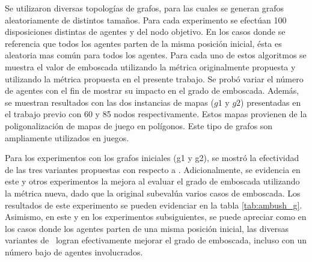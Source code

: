 Se utilizaron diversas topolog\'ias de grafos, para las cuales
se generan grafos aleatoriamente de distintos tamaños. Para cada
experimento se efect\'uan 100 disposiciones distintas de agentes
y del nodo objetivo. En los casos donde se referencia
que todos los agentes parten de la misma posici\'on inicial, \'esta es
aleatoria mas com\'un para todos los agentes.
Para cada uno de estos algoritmos se muestra el valor de emboscada
utilizando la m\'etrica originalmente propuesta y utilizando la
m\'etrica propuesta en el presente trabajo. Se prob\'o variar el
n\'umero de agentes con el fin de mostrar su impacto en el grado de emboscada.
Adem\'as, se muestran resultados con las dos instancias de mapas ($g1$ y $g2$)
presentadas en el trabajo previo \cite{FGC12} con 60 y 85 nodos
respectivamente. Estos mapas provienen de la poligonalizaci\'on de mapas
de juego en pol\'igonos. Este tipo de grafos son ampliamente utilizados
en juegos\cite{MF09}.



Para los experimentos con los grafos iniciales (g1 y g2), se mostr\'o
la efectividad de las tres variantes propuestas con respecto a \astar.
Adicionalmente, se evidencia en este y otros experimentos la mejora
al evaluar el grado de emboscada utilizando la m\'etrica nueva, dado
que la original subeval\'ua va\-rios casos de emboscada.
Los resultados de este experimento se pueden evidenciar en la tabla
\ref{tab:ambush_g}. Asimismo, en este y en los experimentos subsiguientes,
se puede apreciar como en los casos donde los agentes parten de una misma
posici\'on inicial, las diversas variantes de \ambush\ logran efectivamente
mejorar el grado de emboscada, incluso con un n\'umero bajo de agentes
involucrados.





